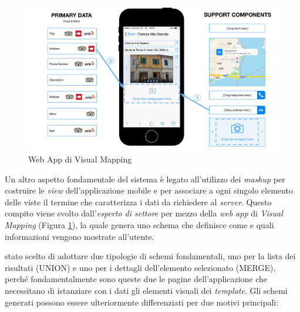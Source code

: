 \begin{figure}[ht]
	\centering
	\includegraphics[width=\textwidth]{3-metodologia-camus/Immagini/visual-mapping-nuovo.png}
	\caption{Web App di Visual Mapping}\label{fig:visual-mapping}
\end{figure}

Un altro aspetto fondamentale del sistema è legato all'utilizzo dei \emph{mashup} per costruire le \emph{view} dell'applicazione mobile e per associare a ogni singolo elemento delle viste il termine che caratterizza i dati da richiedere al \emph{server}. Questo compito viene svolto dall'\emph{esperto di settore} per mezzo della \emph{web app} di \emph{Visual Mapping} (Figura \ref{fig:visual-mapping}), la quale genera uno schema che definisce come e quali informazioni vengono mostrate all'utente.

\upe stato scelto di adottare due tipologie di schemi fondamentali, uno per la lista dei risultati (UNION) e uno per i dettagli dell'elemento selezionato (MERGE), perché fondamentalmente sono queste due le pagine dell'applicazione che necessitano di istanziare con i dati gli elementi visuali dei \emph{template}.
Gli schemi generati possono essere ulteriormente differenziati per due motivi principali:

